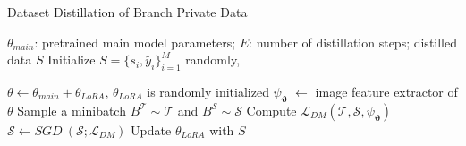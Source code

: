 \begin{algorithm} 
    \caption{Dataset Distillation of Branch Private Data}    
    \label{algorithm:alg1}       
    \begin{algorithmic}[1] 
    \Require $\theta_{main}$: pretrained main model parameters; $E$: number of distillation steps; 
    \Ensure distilled data $S$
    \State Initialize ${S=\{{s_i},\tilde{y_i}\}^M_{i=1}}$ randomly, 
    
    \State $\theta \leftarrow \theta_{main} + \theta_{LoRA}$, $\theta_{LoRA}$ is randomly initialized
    \State $\psi_{\boldsymbol{\vartheta}}$ $\leftarrow$ image feature extractor of $\theta $
    \State Sample a minibatch $B^\mathcal{T} \sim \mathcal{T}$ and $B^\mathcal{S} \sim \mathcal{S}$
    \State Compute $\mathcal{L}_{DM}(\mathcal{T},\mathcal{S},\psi_{\boldsymbol{\vartheta}})$
    \State $\mathcal{S} \leftarrow SGD\ (\mathcal{S};\mathcal{L}_{DM})$
    \State Update $\theta_{LoRA}$ with $S$
    \EndFor
    \end{algorithmic} 
\end{algorithm} 
